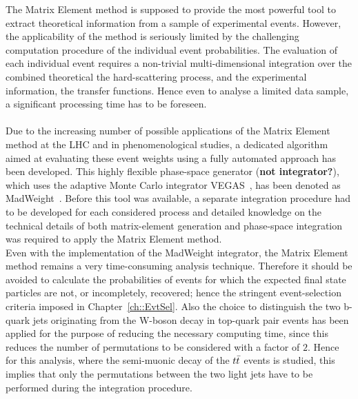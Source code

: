 The Matrix Element method is supposed to provide the most powerful tool to extract theoretical information from a sample of experimental events.
However, the applicability of the method is seriously limited by the challenging computation procedure of the individual event probabilities.
The evaluation of each individual event requires a non-trivial multi-dimensional integration over the combined theoretical the hard-scattering process, and the experimental information, the transfer functions.
Hence even to analyse a limited data sample, a significant processing time has to be foreseen.
\\
\\
Due to the increasing number of possible applications of the Matrix Element method at the LHC and in phenomenological studies, a dedicated algorithm aimed at evaluating these event weights using a fully automated approach has been developed. This highly flexible phase-space generator (\textbf{not integrator?}), which uses the adaptive Monte Carlo integrator VEGAS~\cite{VEGAS}, has been denoted as MadWeight~\cite{MadWeightPaper}.
Before this tool was available, a separate integration procedure had to be developed for each considered process and detailed knowledge on the technical details of both matrix-element generation and phase-space integration was required to apply the Matrix Element method.
\\

Even with the implementation of the MadWeight integrator, the Matrix Element method remains a very time-consuming analysis technique.
Therefore it should be avoided to calculate the probabilities of events for which the expected final state particles are not, or incompletely, recovered; hence the stringent event-selection criteria imposed in Chapter~\ref{ch::EvtSel}.
Also the choice to distinguish the two b-quark jets originating from the W-boson decay in top-quark pair events has been applied for the purpose of reducing the necessary computing time, since this reduces the number of permutations to be considered with a factor of $2$.
Hence for this analysis, where the semi-muonic decay of the $t\bar{t}$ events is studied, this implies that only the permutations between the two light jets have to be performed during the integration procedure. 


